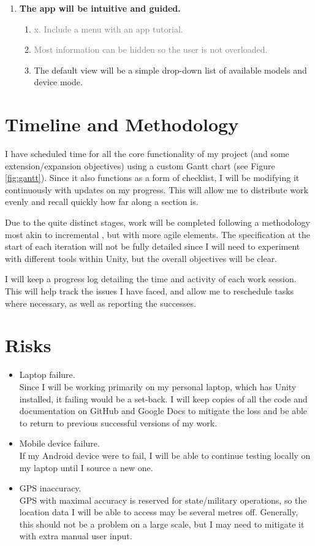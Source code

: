 \documentclass{article}
\newcommand{\light}[1]{\textcolor{gray}{#1}}
\begin{document}
\begin{enumerate}[label=(\Alph*)]
\item \textbf{The app will be intuitive and guided.}
    \begin{enumerate}[label=\arabic*.]
    \item \light{x. Include a menu with an app tutorial.}
    \item \light{Most information can be hidden so the user is not overloaded.}
    \item The default view will be a simple drop-down list of available models and device mode.
    \end{enumerate}
\end{enumerate}

\section{Timeline and Methodology}
I have scheduled time for all the core functionality of my project (and some extension/expansion objectives) using a custom Gantt chart (see Figure \ref{fig:gantt}). Since it also functions as a form of checklist, I will be modifying it continuously with updates on my progress. This will allow me to distribute work evenly and recall quickly how far along a section is.

Due to the quite distinct stages, work will be completed following a methodology most akin to incremental \cite{agile}, but with more agile elements. The specification at the start of each iteration will not be fully detailed since I will need to experiment with different tools within Unity, but the overall objectives will be clear. 

I will keep a progress log detailing the time and activity of each work session. This will help track the issues I have faced, and allow me to reschedule tasks where necessary, as well as reporting the successes. 

\newpage
\section{Risks}
\begin{itemize}
    \item Laptop failure. \\
    Since I will be working primarily on my personal laptop, which has Unity installed, it failing would be a set-back. I will keep copies of all the code and documentation on GitHub and Google Docs to mitigate the loss and be able to return to previous successful versions of my work.
    \item Mobile device failure. \\
    If my Android device were to fail, I will be able to continue testing locally on my laptop until I source a new one.
    \item GPS inaccuracy. \\
    GPS with maximal accuracy is reserved for state/military operations, so the location data I will be able to access may be several metres off. Generally, this should not be a problem on a large scale, but I may need to mitigate it with extra manual user input. 
\end{itemize}
\end{document}
